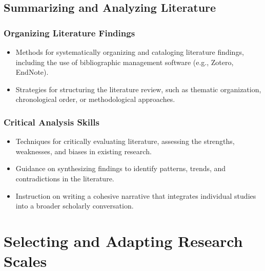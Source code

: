 \documentclass[
]{book}
\begin{document}
\hypertarget{summarizing-and-analyzing-literature}{%
\section*{Summarizing and Analyzing Literature}\label{summarizing-and-analyzing-literature}}

\hypertarget{organizing-literature-findings}{%
\subsection*{Organizing Literature Findings}\label{organizing-literature-findings}}

\begin{itemize}
\item
  Methods for systematically organizing and cataloging literature findings, including the use of bibliographic management software (e.g., Zotero, EndNote).
\item
  Strategies for structuring the literature review, such as thematic organization, chronological order, or methodological approaches.
\end{itemize}

\hypertarget{critical-analysis-skills}{%
\subsection*{Critical Analysis Skills}\label{critical-analysis-skills}}

\begin{itemize}
\item
  Techniques for critically evaluating literature, assessing the strengths, weaknesses, and biases in existing research.
\item
  Guidance on synthesizing findings to identify patterns, trends, and contradictions in the literature.
\item
  Instruction on writing a cohesive narrative that integrates individual studies into a broader scholarly conversation.
\end{itemize}

\hypertarget{selecting-and-adapting-research-scales}{%
\chapter*{Selecting and Adapting Research Scales}\label{selecting-and-adapting-research-scales}}
\end{document}
